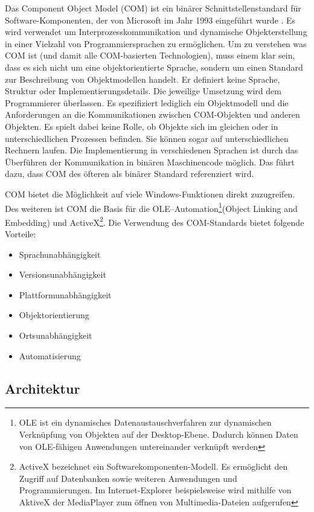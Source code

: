 Das Component Object Model (COM) ist ein binärer Schnittstellenstandard für Software-Komponenten, der von Microsoft im Jahr 1993 eingeführt wurde \cite{SWB-088582566}. Es wird verwendet um Interprozesskommunikation und dynamische Objekterstellung in einer Vielzahl von Programmiersprachen zu ermöglichen. Um zu verstehen was COM ist (und damit alle COM-basierten Technologien), muss einem klar sein, dass es sich nicht um eine objektorientierte Sprache, sondern um einen Standard zur Beschreibung von Objektmodellen handelt. Er definiert keine Sprache, Struktur oder Implementierungsdetails. Die jeweilige Umsetzung wird dem Programmierer überlassen. Es spezifiziert lediglich ein Objektmodell und die Anforderungen an die Kommunikationen zwischen COM-Objekten und anderen Objekten. Es spielt dabei keine Rolle, ob Objekte sich im gleichen oder in unterschiedlichen Prozessen befinden. Sie können sogar auf unterschiedlichen Rechnern laufen. Die Implementierung in verschiedenen Sprachen ist durch das Überführen der Kommunikation in binären Maschinencode möglich. Das führt dazu, dass COM des öfteren als binärer Standard referenziert wird.

COM bietet die Möglichkeit auf viele Windows-Funktionen direkt zuzugreifen. Des weiteren ist COM die Basis für die OLE–Automation\footnote{OLE ist ein dynamisches Datenaustauschverfahren zur dynamischen Verknüpfung von Objekten auf der Desktop-Ebene. Dadurch können Daten von OLE-fähigen Anwendungen untereinander verknüpft werden}(Object Linking and Embedding) und ActiveX\footnote{ActiveX bezeichnet ein Softwarekomponenten-Modell. Es ermöglicht den Zugriff auf Datenbanken sowie weiteren Anwendungen und Programmierungen. Im Internet-Explorer beispielsweise wird mithilfe von AktiveX der MediaPlayer zum öffnen von Multimedia-Dateien aufgerufen}. Die Verwendung des COM-Standards bietet folgende Vorteile:

\begin{itemize}
\item Sprachunabhängigkeit
\item Versionsunabhängigkeit
\item Plattformunabhängigkeit
\item Objektorientierung
\item Ortsunabhängigkeit
\item Automatisierung
\end{itemize} 

\subsection{Architektur}
\label{ch:grundlagen:sec:ComponentObjectModel:subsec:Architektur}

